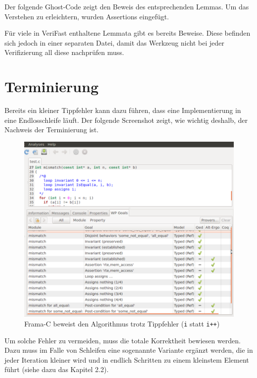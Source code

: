 Der folgende Ghost-Code zeigt den Beweis des entsprechenden Lemmas. Um das Verstehen zu erleichtern,
wurden Assertions eingefügt.


Für viele in VeriFast enthaltene Lemmata gibt es bereits Beweise. Diese befinden sich jedoch in einer separaten
Datei, damit das Werkzeug nicht bei jeder Verifizierung all diese nachprüfen muss.


\section{Terminierung}

Bereits ein kleiner Tippfehler kann dazu führen, dass eine Implementierung in eine Endlosschleife läuft. Der folgende
Screenshot zeigt, wie wichtig deshalb, der Nachweis der Terminierung ist.

\begin{figure}[H]
	\centering
\includegraphics[width=1.0\textwidth]{images/frama-c-partial-correctness.png}
\caption{Frama-C beweist den Algorithmus trotz Tippfehler (\texttt{i} statt \texttt{i++})}
\end{figure}

Um solche Fehler zu vermeiden, muss die totale Korrektheit bewiesen werden. Dazu muss im Falle von Schleifen 
eine sogenannte Variante ergänzt werden, die in jeder Iteration kleiner wird und in endlich Schritten zu einem 
kleinstem Element führt (siehe dazu das Kapitel 2.2).

